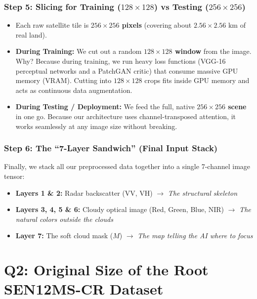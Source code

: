 \documentclass[11pt,a4paper]{article}
\begin{document}
\subsubsection*{Step 5: Slicing for Training ($128 \times 128$) vs Testing ($256 \times 256$)}
\begin{itemize}[leftmargin=1.5em]
    \item Each raw satellite tile is \textbf{$256 \times 256$ pixels} (covering about $2.56 \times 2.56\text{ km}$ of real land).
    \item \textbf{During Training:} We cut out a random \textbf{$128 \times 128$ window} from the image. Why? Because during training, we run heavy loss functions (VGG-16 perceptual networks and a PatchGAN critic) that consume massive GPU memory (VRAM). Cutting into $128 \times 128$ crops fits inside GPU memory and acts as continuous data augmentation.
    \item \textbf{During Testing / Deployment:} We feed the full, native \textbf{$256 \times 256$ scene} in one go. Because our architecture uses channel-transposed attention, it works seamlessly at any image size without breaking.
\end{itemize}

\subsubsection*{Step 6: The ``7-Layer Sandwich'' (Final Input Stack)}
Finally, we stack all our preprocessed data together into a single 7-channel image tensor:
\begin{itemize}[leftmargin=1.5em]
    \item \textbf{Layers 1 \& 2:} Radar backscatter (VV, VH) $\rightarrow$ \textit{The structural skeleton}
    \item \textbf{Layers 3, 4, 5 \& 6:} Cloudy optical image (Red, Green, Blue, NIR) $\rightarrow$ \textit{The natural colors outside the clouds}
    \item \textbf{Layer 7:} The soft cloud mask ($M$) $\rightarrow$ \textit{The map telling the AI where to focus}
\end{itemize}

\bigskip

\section{Q2: Original Size of the Root SEN12MS-CR Dataset}
\end{document}
